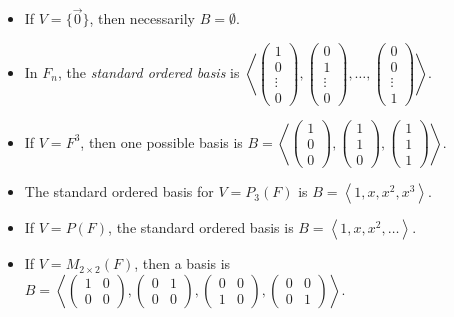 \begin{exmp}\proofbreak
    \begin{itemize}
        \item If $V = \{\vec{0}\}$, then necessarily $B = \emptyset$.
        \item In $F_n$, the \emph{standard ordered basis} is $\left\langle \begin{pmatrix}1 \\ 0 \\ \vdots \\ 0\end{pmatrix}, \begin{pmatrix}0 \\ 1 \\ \vdots \\ 0\end{pmatrix}, \ldots, \begin{pmatrix}0 \\ 0 \\ \vdots \\ 1\end{pmatrix}\right\rangle$.
        \item If $V = F^3$, then one possible basis is $B = \left\langle \begin{pmatrix}1 \\ 0 \\ 0\end{pmatrix}, \begin{pmatrix}1 \\ 1 \\ 0\end{pmatrix}, \begin{pmatrix}1 \\ 1 \\ 1\end{pmatrix}\right\rangle$.
        \item The standard ordered basis for $V = P_3(F)$ is $B = \left\langle 1, x, x^2, x^3 \right\rangle$.
        \item If $V = P(F)$, the standard ordered basis is $B = \left\langle 1, x, x^2, \ldots \right\rangle$.
        \item If $V = M_{2\times 2}(F)$, then a basis is $B = \left\langle
        \begin{pmatrix}1 & 0 \\ 0 & 0\end{pmatrix},
        \begin{pmatrix}0 & 1 \\ 0 & 0\end{pmatrix},
        \begin{pmatrix}0 & 0 \\ 1 & 0\end{pmatrix},
        \begin{pmatrix}0 & 0 \\ 0 & 1\end{pmatrix}\right\rangle$.
    \end{itemize}
\end{exmp}

